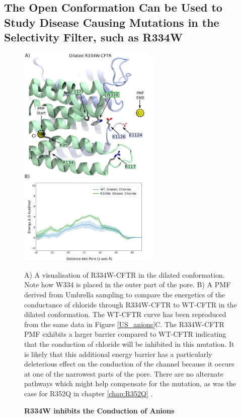 \subsection{The Open Conformation Can be Used to Study Disease Causing Mutations in the Selectivity Filter, such as R334W}


\begin{figure}
	\begin{center}
		\includegraphics[width=0.6\textwidth]{figures/opening/R334W_pmf_combined.pdf}
	\end{center}
	\captionsetup{singlelinecheck = false, justification=raggedright}
	\caption[R334W Inhibits the Conduction of Anions] {\textbf{R334W inhibits the Conduction of Anions}}{A) A visualisation of R334W-CFTR in the dilated conformation. Note how W334 is placed in the outer part of the pore. B) A PMF derived from Umbrella sampling to compare the energetics of the conductance of chloride through R334W-CFTR to WT-CFTR in the dilated conformation. The WT-CFTR curve has been reproduced from the same data in Figure \ref{US_anions}C. The R334W-CFTR PMF exhibits a larger barrier compared to WT-CFTR indicating that the conduction of chloride will be inhibited in this mutation. It is likely that this additional energy barrier has a particularly deleterious effect on the conduction of the channel because it occurs at one of the narrowest parts of the pore. There are no alternate pathways which might help compensate for the mutation, as was the case for R352Q in chapter \ref{chap:R352Q} \cite{wong2022a}.  }
	\label{R334_pmf}
\end{figure}

